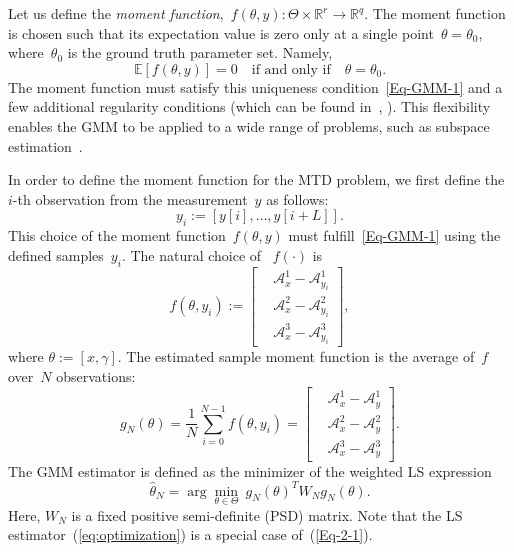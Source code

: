 \documentclass{article}
\newcommand{\A}[0]{\mathcal{A}}
\newcommand{\E}[0]{\mathbb{E}}
\newcommand{\R}[0]{\mathbb{R}}
\begin{document}
Let us define the \textit{moment function},~\mbox{$f(\theta, y)\colon \Theta \times \R^r \to \R^q$}. The moment function is chosen such that its expectation value is zero only at a single point~$\theta=\theta_0$, where~$\theta_0$ is the ground truth parameter set. Namely,
\begin{equation}\label{Eq-GMM-1}
	\E\left[f(\theta,y)\right] = 0 \quad \text{if and only if} \quad \theta = \theta_0.
\end{equation}
The moment function must satisfy this uniqueness condition~\eqref{Eq-GMM-1} and a few additional regularity conditions (which can be found in~\cite{Hansen1982}, \cite{Hall2005} \cite{abas2021generalized}). This flexibility enables the GMM to be applied to a wide range of problems, such as subspace estimation~\cite{fan2018optimal}.

In order to define the moment function for the MTD problem, we first define the $i$-th observation from the measurement~$y$ as follows:
\begin{equation}
	y_i := [y[i],\ldots, y[i+L]].
\end{equation}
This choice of the moment function~$f(\theta, y)$ must fulfill~\eqref{Eq-GMM-1} using the defined samples~$y_i$. The natural choice of ~$f(\cdot)$ is
\begin{equation} \label{Eq-GMM-2}
	f(\theta,y_i) :=
	\begin{bmatrix}
		&\A_x^1 - \A_{y_i}^1\\
		&\A_x^2 - \A_{y_i}^2 \\
		&\A_x^3 - \A_{y_i}^3
	\end{bmatrix},
\end{equation}
where $\theta := [x, \gamma]$.
The estimated sample moment function is the average of~$f$ over~$N$ observations:
\begin{equation}\label{Eq-2-5}
	g_N(\theta) = \frac{1}{N} \sum_{i = 0}^{N - 1} f(\theta, y_i) = \begin{bmatrix}
		&\A_x^1 - \A_{y}^1\\
		&\A_x^2 - \A_{y}^2 \\
		&\A_x^3 - \A_{y}^3
	\end{bmatrix}.
\end{equation}
The GMM estimator is defined as the minimizer of the weighted LS expression
\begin{equation} \label{Eq-2-1}
	\hat{\theta}_N = \arg\min_{\theta \in \Theta} \ g_N(\theta)^T W_N g_N(\theta).
\end{equation}
Here, $W_N$ is a fixed positive semi-definite (PSD) matrix. Note that the LS estimator~(\ref{eq:optimization}) is a special case of~(\ref{Eq-2-1}).
\end{document}
